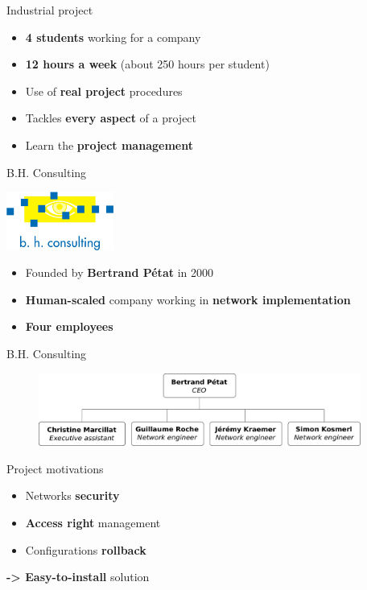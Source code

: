 \documentclass[12pt]{beamer}
\begin{document}
\begin{frame}{Industrial project}
    \begin{itemize}[<+->]
    \item \textbf{4 students} working for a company\vfill
    \item \textbf{12 hours a week} (about 250 hours per student)\vfill
    \item Use of \textbf{real project} procedures\vfill
    \item Tackles \textbf{every aspect} of a project\vfill
    \item Learn the \textbf{project management} \vfill
    \end{itemize}
\end{frame}

\begin{frame}{B.H. Consulting}
    \begin{center}
	\includegraphics[width=100pt]{img/BHConsulting.jpg}
    \end{center}

    \begin{itemize}[<+->]
    \item Founded by \textbf{Bertrand Pétat} in 2000\vfill
    \item \textbf{Human-scaled} company working in \textbf{network implementation}\vfill
    \item \textbf{Four employees}\vfill
    \end{itemize}
\end{frame}

\begin{frame}{B.H. Consulting}
\vfill
    \begin{figure}
	\includegraphics[width=300pt]{img/organigramme_en.pdf}
    \end{figure}
\vfill
\end{frame}

\begin{frame}{Project motivations}
    \begin{itemize}[<+->]
	\item Networks \textbf{security}
	\vfill
	\item \textbf{Access right} management
	\vfill
	\item Configurations \textbf{rollback}
	\vfill
    \end{itemize}
\pause
\textbf{-> Easy-to-install} solution

\end{frame}
    
\end{document}
